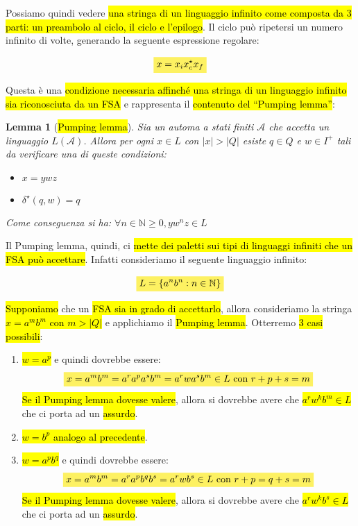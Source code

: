 \documentclass[a4paper,11pt,oneside]{article}
\theoremstyle{plain}
\newtheorem{lem}{Lemma}[section]
\theoremstyle{definition}
\theoremstyle{remark}
\newcommand{\mhl}[1]{\colorbox{hlcolor}{$\displaystyle #1$}}
\begin{document}
Possiamo quindi vedere \hl{una stringa di un linguaggio infinito come composta
da 3 parti: un preambolo al ciclo, il ciclo e l'epilogo}. Il ciclo può ripetersi
un numero infinito di volte, generando la seguente espressione regolare:

\begin{equation}
  \mhl{x = x_i x_c^\star x_f}
\end{equation}

Questa è una \hl{condizione necessaria affinché una stringa di un linguaggio
infinito sia riconosciuta da un FSA} e rappresenta il \hl{contenuto del
``Pumping lemma''}:

\begin{lem}[\hl{Pumping lemma}]\label{thm:pumping-lemma}
  Sia un automa a stati finiti $\mathcal{A}$ che accetta un linguaggio
  $L(\mathcal{A})$. Allora per ogni $x \in L$ con $|x| > |Q|$ esiste $q \in Q$
  e $w \in I^+$ tali da verificare una di queste condizioni:

  \begin{itemize}
    \item $x = ywz$
    \item $\delta^\star(q,w) = q$
  \end{itemize}

  Come conseguenza si ha: $\forall n \in \mathbb{N} \geq 0, y w^n z \in L$
\end{lem}

Il Pumping lemma, quindi, ci \hl{mette dei paletti sui tipi di linguaggi
infiniti che un FSA può accettare}. Infatti consideriamo il seguente linguaggio
infinito:

\begin{equation}
  \mhl{L = \{ a^n b^n : n \in \mathbb{N} \}}
\end{equation}

\hl{Supponiamo} che un \hl{FSA sia in grado di accettarlo}, allora consideriamo
la stringa \hl{$x = a^m b^m$ con $m > |Q|$} e applichiamo il \hl{Pumping lemma}.
Otterremo \hl{3 casi possibili}:

\begin{enumerate}
  \item \hl{$w = a^p$} e quindi dovrebbe essere:
    \[
      \mhl{
      x = a^m b^m = a^r a^p a^s b^m = a^r w a^s b^m \in L \text{ con } r+p+s=m
    }
    \]
    \hl{Se il Pumping lemma dovesse valere}, allora si dovrebbe avere che
    \hl{$a^r w^k b^m \in L$} che ci porta ad un \hl{assurdo}.
  \item \hl{$w = b^p$ analogo al precedente}.
  \item \hl{$w = a^p b^q$} e quindi dovrebbe essere:
    \[
      \mhl{
      x = a^m b^m = a^r a^p b^q b^s = a^r w b^s \in L \text{ con } r+p=q+s=m
      }
    \]
    \hl{Se il Pumping lemma dovesse valere}, allora si dovrebbe avere che
    \hl{$a^r w^k b^s \in L$} che ci porta ad un \hl{assurdo}.
\end{enumerate}
\end{document}
